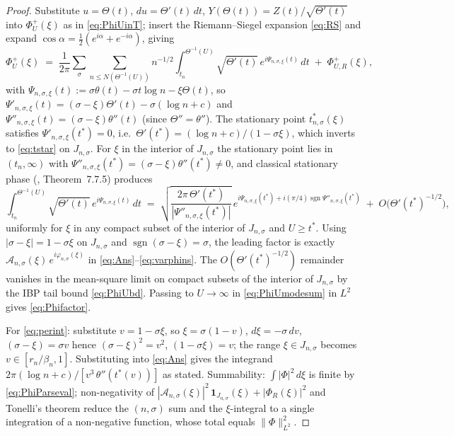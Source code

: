 \documentclass[11pt]{article}
\begin{document}
\begin{proof}
Substitute $u=\Theta(t)$, $du=\Theta'(t)\,dt$, $Y(\Theta(t))=Z(t)/\sqrt{\Theta'(t)}$ into $\Phi_U^{+}(\xi)$ as in \eqref{eq:PhiUinT}; insert the Riemann--Siegel expansion \eqref{eq:RS} and expand $\cos\alpha=\tfrac12(e^{i\alpha}+e^{-i\alpha})$, giving
\begin{equation}\label{eq:PhiUmodesum}
\Phi_U^{+}(\xi)\;=\;\frac{1}{2\pi}\sum_{\sigma}\sum_{n\le N(\Theta^{-1}(U))}n^{-1/2}\int_{t_n}^{\Theta^{-1}(U)}\sqrt{\Theta'(t)}\,e^{i\Psi_{n,\sigma,\xi}(t)}\,dt\;+\;\Phi_{U,R}^{+}(\xi),
\end{equation}
with $\Psi_{n,\sigma,\xi}(t):=\sigma\theta(t)-\sigma t\log n-\xi\Theta(t)$, so $\Psi'_{n,\sigma,\xi}(t)=(\sigma-\xi)\Theta'(t)-\sigma(\log n+c)$ and $\Psi''_{n,\sigma,\xi}(t)=(\sigma-\xi)\theta''(t)$ (since $\Theta''=\theta''$). The stationary point $t^{*}_{n,\sigma}(\xi)$ satisfies $\Psi'_{n,\sigma,\xi}(t^{*})=0$, i.e.\ $\Theta'(t^{*})=(\log n+c)/(1-\sigma\xi)$, which inverts to \eqref{eq:tstar} on $J_{n,\sigma}$. For $\xi$ in the interior of $J_{n,\sigma}$ the stationary point lies in $(t_n,\infty)$ with $\Psi''_{n,\sigma,\xi}(t^{*})=(\sigma-\xi)\theta''(t^{*})\ne 0$, and classical stationary phase (\cite{Hormander}, Theorem~7.7.5) produces
\[
\int_{t_n}^{\Theta^{-1}(U)}\sqrt{\Theta'(t)}\,e^{i\Psi_{n,\sigma,\xi}(t)}\,dt\;=\;\sqrt{\frac{2\pi\,\Theta'(t^{*})}{|\Psi''_{n,\sigma,\xi}(t^{*})|}}\,e^{i\Psi_{n,\sigma,\xi}(t^{*})+i(\pi/4)\operatorname{sgn}\Psi''_{n,\sigma,\xi}(t^{*})}\;+\;O\!\bigl(\Theta'(t^{*})^{-1/2}\bigr),
\]
uniformly for $\xi$ in any compact subset of the interior of $J_{n,\sigma}$ and $U\ge t^{*}$. Using $|\sigma-\xi|=1-\sigma\xi$ on $J_{n,\sigma}$ and $\operatorname{sgn}(\sigma-\xi)=\sigma$, the leading factor is exactly $\mathcal A_{n,\sigma}(\xi)\,e^{i\varphi_{n,\sigma}(\xi)}$ in \eqref{eq:Ans}--\eqref{eq:varphins}. The $O(\Theta'(t^{*})^{-1/2})$ remainder vanishes in the mean-square limit on compact subsets of the interior of $J_{n,\sigma}$ by the IBP tail bound \eqref{eq:PhiUbd}. Passing to $U\to\infty$ in \eqref{eq:PhiUmodesum} in $L^{2}$ gives \eqref{eq:Phifactor}.

For \eqref{eq:perint}: substitute $v=1-\sigma\xi$, so $\xi=\sigma(1-v)$, $d\xi=-\sigma\,dv$, $(\sigma-\xi)=\sigma v$ hence $(\sigma-\xi)^{2}=v^{2}$, $(1-\sigma\xi)=v$; the range $\xi\in J_{n,\sigma}$ becomes $v\in[r_n/\beta_n,1]$. Substituting into \eqref{eq:Ans} gives the integrand $2\pi(\log n+c)/[v^{3}\,\theta''(t^{*}(v))]$ as stated. Summability: $\int|\Phi|^{2}\,d\xi$ is finite by \eqref{eq:PhiParseval}; non-negativity of $|\mathcal A_{n,\sigma}(\xi)|^{2}\,\mathbf{1}_{J_{n,\sigma}}(\xi)+|\Phi_R(\xi)|^{2}$ and Tonelli's theorem reduce the $(n,\sigma)$ sum and the $\xi$-integral to a single integration of a non-negative function, whose total equals $\|\Phi\|_{L^{2}}^{2}$.
\end{proof}
\end{document}

